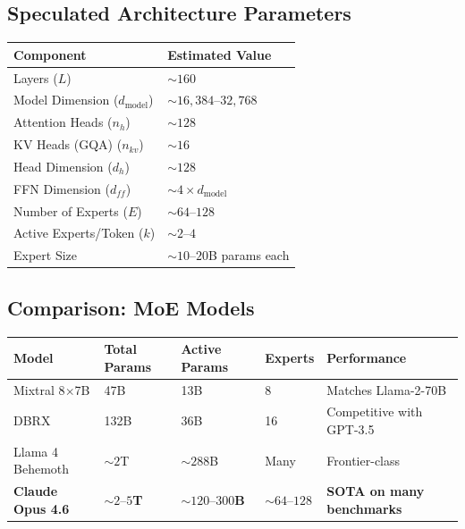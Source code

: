 \documentclass[11pt,a4paper]{article}
\begin{document}
\subsection{Speculated Architecture Parameters}

\begin{center}
\begin{tabular}{ll}
\toprule
\textbf{Component} & \textbf{Estimated Value} \\
\midrule
Layers ($L$) & $\sim 160$ \\
Model Dimension ($d_{\text{model}}$) & $\sim 16{,}384\text{--}32{,}768$ \\
Attention Heads ($n_h$) & $\sim 128$ \\
KV Heads (GQA) ($n_{kv}$) & $\sim 16$ \\
Head Dimension ($d_h$) & $\sim 128$ \\
FFN Dimension ($d_{ff}$) & $\sim 4 \times d_{\text{model}}$ \\
Number of Experts ($E$) & $\sim 64\text{--}128$ \\
Active Experts/Token ($k$) & $\sim 2\text{--}4$ \\
Expert Size & $\sim 10\text{--}20$B params each \\
\bottomrule
\end{tabular}
\end{center}

\subsection{Comparison: MoE Models}

\begin{center}
\begin{tabular}{lllll}
\toprule
\textbf{Model} & \textbf{Total Params} & \textbf{Active Params} & \textbf{Experts} & \textbf{Performance} \\
\midrule
Mixtral 8$\times$7B & 47B & 13B & 8 & Matches Llama-2-70B \\
DBRX & 132B & 36B & 16 & Competitive with GPT-3.5 \\
Llama 4 Behemoth & $\sim 2$T & $\sim 288$B & Many & Frontier-class \\
\textbf{Claude Opus 4.6} & $\sim 2\text{--}5$\textbf{T} & $\sim 120\text{--}300$\textbf{B} & $\sim 64\text{--}128$ & \textbf{SOTA on many benchmarks} \\
\bottomrule
\end{tabular}
\end{center}
\end{document}
